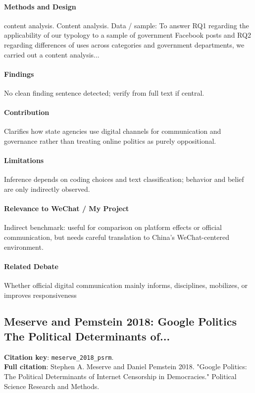 \documentclass[12pt]{article}
\begin{document}
\paragraph{Methods and Design} content analysis. Content analysis. Data / sample: To answer RQ1 regarding the applicability of our typology to a sample of government Facebook posts and RQ2 regarding differences of uses across categories and government departments, we carried out a content analysis...

\paragraph{Findings} No clean finding sentence detected; verify from full text if central.

\paragraph{Contribution} Clarifies how state agencies use digital channels for communication and governance rather than treating online politics as purely oppositional.

\paragraph{Limitations} Inference depends on coding choices and text classification; behavior and belief are only indirectly observed.

\paragraph{Relevance to WeChat / My Project} Indirect benchmark: useful for comparison on platform effects or official communication, but needs careful translation to China's WeChat-centered environment.

\paragraph{Related Debate} Whether official digital communication mainly informs, disciplines, mobilizes, or improves responsiveness


\subsection{Meserve and Pemstein 2018: Google Politics The Political Determinants of...}
\textbf{Citation key}: \texttt{meserve\_2018\_psrm}.\\
\textbf{Full citation}: Stephen A. Meserve and Daniel Pemstein 2018. "Google Politics: The Political Determinants of Internet Censorship in Democracies." Political Science Research and Methods.
\end{document}
